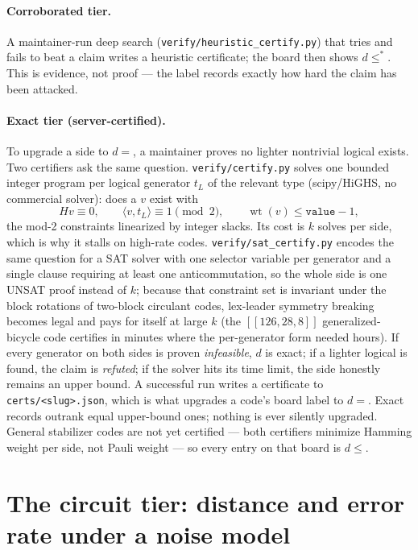 \documentclass[11pt]{article}
\newcommand{\wt}{\operatorname{wt}}
\begin{document}
	\paragraph{Corroborated tier.} A maintainer-run deep search
	(\texttt{verify/heuristic\_certify.py}) that tries and fails to beat a
	claim writes a heuristic certificate; the board then shows $d\le^{*}$.
	This is evidence, not proof --- the label records exactly how hard the
	claim has been attacked.

	\paragraph{Exact tier (server-certified).} To upgrade a side to $d=$, a
	maintainer proves no lighter nontrivial logical exists. Two certifiers
	ask the same question. \texttt{verify/certify.py} solves one bounded
	integer program per logical generator $t_L$ of the relevant type
	(scipy/HiGHS, no commercial solver): does a $v$ exist with
	\begin{equation}
		H v \equiv 0,\qquad \langle v,t_L\rangle\equiv 1 \pmod 2,\qquad
		\wt(v)\le \texttt{value}-1,
		\label{eq:milp}
	\end{equation}
	the mod-2 constraints linearized by integer slacks. Its cost is $k$
	solves per side, which is why it stalls on high-rate codes.
	\texttt{verify/sat\_certify.py} encodes the same question for a SAT
	solver with one selector variable per generator and a single clause
	requiring at least one anticommutation, so the whole side is one
	UNSAT proof instead of $k$; because that constraint set is invariant
	under the block rotations of two-block circulant codes, lex-leader
	symmetry breaking becomes legal and pays for itself at large $k$ (the
	$[[126,28,8]]$ generalized-bicycle code certifies in minutes where the
	per-generator form needed hours). If every
	generator on both sides is proven \emph{infeasible}, $d$ is exact; if a
	lighter logical is found, the claim is \emph{refuted}; if the solver
	hits its time limit, the side honestly remains an upper bound. A
	successful run writes a certificate to \texttt{certs/<slug>.json}, which
	is what upgrades a code's board label to $d=$. Exact records outrank
	equal upper-bound ones; nothing is ever silently upgraded. General
	stabilizer codes are not yet certified --- both certifiers minimize
	Hamming weight per side, not Pauli weight --- so every entry on that
	board is $d\le$.

	\section{The circuit tier: distance and error rate under a noise model}
	\label{sec:circuit}
\end{document}
